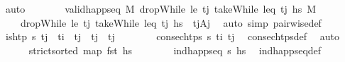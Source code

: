 \begin{isabellebody}
\ auto\isanewline
\ \ \ \ \isamarkupfalse%
\ \isamarkupfalse%
\ {\isachardoublequoteopen}valid{\isacharunderscore}{\kern0pt}happ{\isacharunderscore}{\kern0pt}seq\ M\ {\isacharparenleft}{\kern0pt}dropWhile\ {\isacharparenleft}{\kern0pt}le\ t\isactrlsub j{\isacharparenright}{\kern0pt}\ {\isacharparenleft}{\kern0pt}takeWhile\ {\isacharparenleft}{\kern0pt}leq\ t\isactrlsub j{\isacharparenright}{\kern0pt}\ hs{\isacharparenright}{\kern0pt}{\isacharparenright}{\kern0pt}\ M{\isacharprime}{\kern0pt}{\isachardoublequoteclose}\isanewline
\ \ \ \ \ \ \isamarkupfalse%
\ {}\ {}\ {}\ {\isacartoucheopen}dropWhile\ {\isacharparenleft}{\kern0pt}le\ t\isactrlsub j{\isacharparenright}{\kern0pt}\ {\isacharparenleft}{\kern0pt}takeWhile\ {\isacharparenleft}{\kern0pt}leq\ t\isactrlsub j{\isacharparenright}{\kern0pt}\ hs{\isacharparenright}{\kern0pt}\ {\isacharequal}{\kern0pt}\ {\isacharbrackleft}{\kern0pt}{\isacharparenleft}{\kern0pt}t\isactrlsub j{\isacharcomma}{\kern0pt}A\isactrlsub j{\isacharparenright}{\kern0pt}{\isacharbrackright}{\kern0pt}{\isacartoucheclose}\ \isamarkupfalse%
\ {\isacharparenleft}{\kern0pt}auto\ simp{\isacharcolon}{\kern0pt}\ pairwise{\isacharunderscore}{\kern0pt}def{\isacharparenright}{\kern0pt}\isanewline
\isanewline
\ \ \ \ \isamarkupfalse%
\ {\isachardoublequoteopen}is{\isacharunderscore}{\kern0pt}htp\ {\isasympi}s\ t\isactrlsub j{\isachardoublequoteclose}\ \ {\isachardoublequoteopen}t\isactrlsub i\ {\isacharless}{\kern0pt}\ t\isactrlsub j{\isachardoublequoteclose}\ \ {\isachardoublequoteopen}t\isactrlsub j\ {\isasymle}\ t\isactrlsub j{\isachardoublequoteclose}\isanewline
\ \ \ \ \ \ \isamarkupfalse%
\ {\isacartoucheopen}consec{\isacharunderscore}{\kern0pt}htps\ {\isasympi}s\ t\isactrlsub i\ t\isactrlsub j{\isacartoucheclose}\ \isamarkupfalse%
\ consec{\isacharunderscore}{\kern0pt}htps{\isacharunderscore}{\kern0pt}def\ \isamarkupfalse%
\ auto\isanewline
\ \ \ \ \isamarkupfalse%
\ {\isachardoublequoteopen}strict{\isacharunderscore}{\kern0pt}sorted\ {\isacharparenleft}{\kern0pt}map\ fst\ hs{\isacharparenright}{\kern0pt}{\isachardoublequoteclose}\isanewline
\ \ \ \ \ \ \isamarkupfalse%
\ {\isacartoucheopen}ind{\isacharunderscore}{\kern0pt}happ{\isacharunderscore}{\kern0pt}seq\ {\isasympi}s\ hs{\isacartoucheclose}\ \isamarkupfalse%
\ ind{\isacharunderscore}{\kern0pt}happ{\isacharunderscore}{\kern0pt}seq{\isacharunderscore}{\kern0pt}def\ \isamarkupfalse%

\end{isabellebody}
